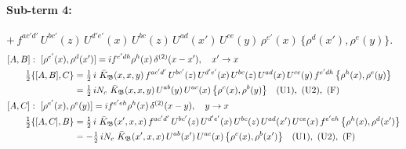 \documentclass[10pt]{article}
\numberwithin{equation}{section}
\begin{document}
\paragraph{Sub-term 4:} $+\,f^{ac'd'}\,U^{bc'}(z)\,U^{d'e'}(x)\,U^{bc}(z)\,U^{ad}(x')\,U^{ce}(y)\,\rho^{e'}(x)\,\big\{\rho^{d}(x'),\rho^{e}(y)\big\}$.
\begin{align}
&[A,B]:\ [\rho^{e'}(x),\rho^{d}(x')]=i f^{e'dh}\rho^{h}(x)\,\delta^{(2)}(x-x'),\quad x'\to x\notag\\
&\qquad \tfrac12\{[A,B],C\}=\tfrac12\,i\,\,\bar K_{\mathfrak B}(x,x,y)\,f^{ac'd'}\,U^{bc'}(z)\,U^{d'e'}(x)\,U^{bc}(z)\,U^{ad}(x)\,U^{ce}(y)\,f^{e'dh}\,\big\{\rho^{h}(x),\rho^{e}(y)\big\}\notag\\
&\qquad\phantom{\tfrac12\{[A,B],C\}}=\tfrac12\,i N_{c}\,\,\bar K_{\mathfrak B}(x,x,y)\,U^{ab}(y)\,U^{ac}(x)\,\big\{\rho^{c}(x),\rho^{b}(y)\big\}\quad\text{(U1)},\ \text{(U2)},\ \text{(F)}
\label{eq:GII.I2-4-AB}\\
&[A,C]:\ [\rho^{e'}(x),\rho^{e}(y)]=i f^{e'eh}\rho^{h}(x)\,\delta^{(2)}(x-y),\quad y\to x\notag\\
&\qquad \tfrac12\{[A,C],B\}=\tfrac12\,i\,\,\bar K_{\mathfrak B}(x',x,x)\,f^{ac'd'}\,U^{bc'}(z)\,U^{d'e'}(x)\,U^{bc}(z)\,U^{ad}(x')\,U^{ce}(x)\,f^{e'eh}\,\big\{\rho^{h}(x),\rho^{d}(x')\big\}\notag\\
&\qquad\phantom{\tfrac12\{[A,C],B\}}=-\tfrac12\,i N_{c}\,\,\bar K_{\mathfrak B}(x',x,x)\,U^{ab}(x')\,U^{ac}(x)\,\big\{\rho^{c}(x),\rho^{b}(x')\big\}\quad\text{(U1)},\ \text{(U2)},\ \text{(F)}
\label{eq:GII.I2-4-AC}
\end{align}
\end{document}
